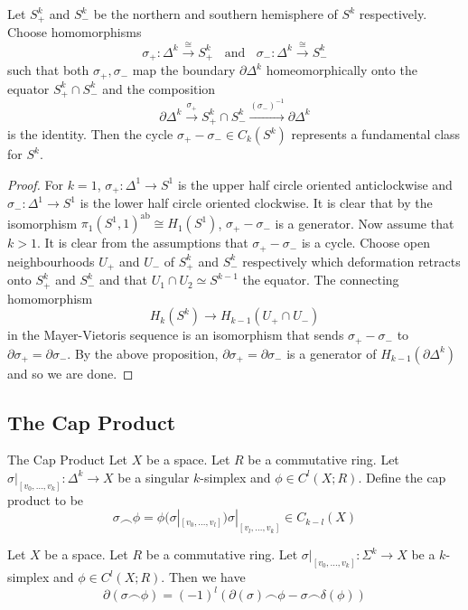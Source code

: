 \documentclass[a4paper]{article}
\begin{document}
\begin{crl}{}{} Let $S_+^k$ and $S_-^k$ be the northern and southern hemisphere of $S^k$ respectively. Choose homomorphisms $$\sigma_+:\Delta^k\overset{\cong}{\longrightarrow} S_+^k\;\;\text{ and }\;\;\sigma_-:\Delta^k\overset{\cong}{\longrightarrow} S_-^k$$ such that both $\sigma_+,\sigma_-$ map the boundary $\partial\Delta^k$ homeomorphically onto the equator $S_+^k\cap S_-^k$ and the composition $$\partial\Delta^k\overset{\sigma_+}{\longrightarrow}S_+^k\cap S_-^k\overset{(\sigma_-)^{-1}}{\longrightarrow}\partial\Delta^k$$ is the identity. Then the cycle $\sigma_+-\sigma_-\in C_k(S^k)$ represents a fundamental class for $S^k$. 
\begin{proof}
For $k=1$, $\sigma_+:\Delta^1\to S^1$ is the upper half circle oriented anticlockwise and $\sigma_-:\Delta^1\to S^1$ is the lower half circle oriented clockwise. It is clear that by the isomorphism $\pi_1(S^1,1)^\text{ab}\cong H_1(S^1)$, $\sigma_+-\sigma_-$ is a generator. Now assume that $k>1$. It is clear from the assumptions that $\sigma_+-\sigma_-$ is a cycle. Choose open neighbourhoods $U_+$ and $U_-$ of $S_+^k$ and $S_-^k$ respectively which deformation retracts onto $S_+^k$ and $S_-^k$ and that $U_1\cap U_2\simeq S^{k-1}$ the equator. The connecting homomorphism $$H_k(S^k)\to H_{k-1}(U_+\cap U_-)$$ in the Mayer-Vietoris sequence is an isomorphism that sends $\sigma_+-\sigma_-$ to $\partial\sigma_+=\partial\sigma_-$. By the above proposition, $\partial\sigma_+=\partial\sigma_-$ is a generator of $H_{k-1}(\partial\Delta^k)$ and so we are done. 
\end{proof}
\end{crl}

\subsection{The Cap Product}
\begin{defn}{The Cap Product}{} Let $X$ be a space. Let $R$ be a commutative ring. Let $\sigma|_{[v_0,\dots,v_k]}:\Delta^k\to X$ be a singular $k$-simplex and $\phi\in C^l(X;R)$. Define the cap product to be $$\sigma\frown\phi=\phi(\sigma|_{[v_0,\dots,v_l]})\sigma|_{[v_l,\dots,v_k]}\in C_{k-l}(X)$$
\end{defn}

\begin{lmm}{}{} Let $X$ be a space. Let $R$ be a commutative ring. Let $\sigma|_[v_0,\dots,v_k]:\Sigma^k\to X$ be a $k$-simplex and $\phi\in C^l(X;R)$. Then we have $$\partial(\sigma\frown\phi)=(-1)^l(\partial(\sigma)\frown\phi-\sigma\frown\delta(\phi))$$
\end{lmm}
\end{document}
